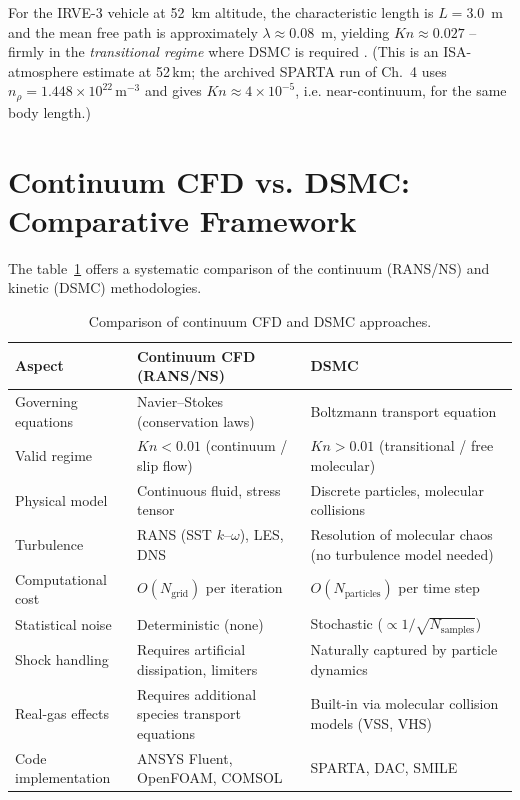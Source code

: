 \noindent For the IRVE-3 vehicle at 52~km altitude, the characteristic length is $L = 3.0$~m and the mean free path is approximately $\lambda \approx 0.08$~m, yielding $Kn \approx 0.027$ -- firmly in the \textit{transitional regime} where DSMC is required \cite{bird1994molecular}. (This is an ISA-atmosphere estimate at 52\,km; the archived SPARTA run of Ch.~4 uses $n_{\rho}=1.448\times10^{22}$\,m$^{-3}$ and gives $Kn\approx4\times10^{-5}$, i.e. near-continuum, for the same body length.)

\section{Continuum CFD vs. DSMC: Comparative Framework}

The table~\ref{tab:cfd_vs_dsmc} offers a systematic comparison of the continuum (RANS/NS) and kinetic (DSMC) methodologies.

\begin{table}[H]
    \centering
    \caption{Comparison of continuum CFD and DSMC approaches.}
    \label{tab:cfd_vs_dsmc}
    \begin{tabularx}{\textwidth}{|>{\RaggedRight\arraybackslash}p{}|>{\RaggedRight\arraybackslash}X|>{\RaggedRight\arraybackslash}X|}
    \hline
    \textbf{Aspect} & \textbf{Continuum CFD (RANS/NS)} & \textbf{DSMC} \\ \hline
    Governing equations & Navier--Stokes (conservation laws) & Boltzmann transport equation \\ \hline
    Valid regime & $Kn < 0.01$ (continuum / slip flow) & $Kn > 0.01$ (transitional / free molecular) \\ \hline
    Physical model & Continuous fluid, stress tensor & Discrete particles, molecular collisions \\ \hline
    Turbulence & RANS (SST $k$--$\omega$), LES, DNS & Resolution of molecular chaos (no turbulence model needed) \\ \hline
    Computational cost & $O(N_{\text{grid}})$ per iteration & $O(N_{\text{particles}})$ per time step \\ \hline
    Statistical noise & Deterministic (none) & Stochastic ($\propto 1/\sqrt{N_{\text{samples}}}$) \\ \hline
    Shock handling & Requires artificial dissipation, limiters & Naturally captured by particle dynamics \\ \hline
    Real-gas effects & Requires additional species transport equations & Built-in via molecular collision models (VSS, VHS) \\ \hline
    Code implementation & ANSYS Fluent, OpenFOAM, COMSOL & SPARTA, DAC, SMILE \\ \hline
    \end{tabularx}
\end{table}

